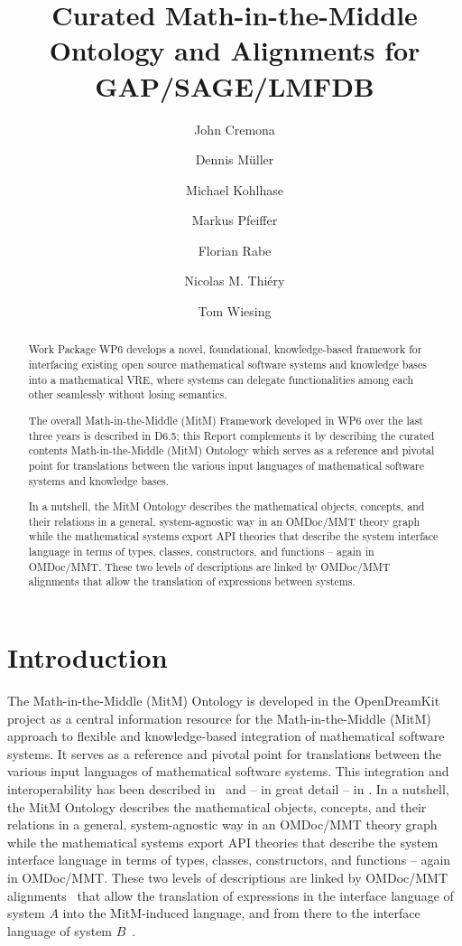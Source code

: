\documentclass{deliverablereport}
\title{Curated Math-in-the-Middle Ontology and Alignments for GAP/SAGE/LMFDB}
\author{John Cremona}
\author{Dennis M\"uller}
\author{Michael Kohlhase}
\author{Markus Pfeiffer}
\author{Florian Rabe}
\author{Nicolas M. Thiéry}
\author{Tom Wiesing}
\begin{document}
\maketitle
\begin{abstract}
  Work Package WP6 develops a novel, foundational, knowledge-based framework for
  interfacing existing open source mathematical software systems and knowledge bases into
  a mathematical VRE, where systems can delegate functionalities among each other
  seamlessly without losing semantics.

  The overall Math-in-the-Middle (MitM) Framework developed in WP6 over the last three
  years is described in D6.5; this Report complements it by describing the curated
  contents Math-in-the-Middle (MitM) Ontology which serves as a reference and pivotal
  point for translations between the various input languages of mathematical software
  systems and knowledge bases.

  In a nutshell, the MitM Ontology describes the mathematical objects, concepts, and their
  relations in a general, system-agnostic way in an OMDoc/MMT theory graph while the
  mathematical systems export API theories that describe the system interface language in
  terms of types, classes, constructors, and functions -- again in OMDoc/MMT. These two
  levels of descriptions are linked by OMDoc/MMT alignments that allow the translation of
  expressions between systems.
\end{abstract}
\tableofcontents\newpage

\section{Introduction}
The Math-in-the-Middle (MitM) Ontology is developed in the OpenDreamKit project as a
central information resource for the Math-in-the-Middle (MitM) approach to flexible and
knowledge-based integration of mathematical software systems. It serves as a reference and
pivotal point for translations between the various input languages of mathematical
software systems. This integration and interoperability has been described
in~\cite{DehKohKon:iop16,WieKohRab:vtuimkb17,KohMuePfe:kbimss17} and -- in great detail --
in \cite{ODK-D6.5}. In a nutshell, the MitM Ontology describes the mathematical objects,
concepts, and their relations in a general, system-agnostic way in an OMDoc/MMT theory
graph while the mathematical systems export API theories that describe the system
interface language in terms of types, classes, constructors, and functions -- again in
OMDoc/MMT. These two levels of descriptions are linked by OMDoc/MMT
alignments~\cite{MueGauKal:cacfms17} that allow the translation of expressions in the
interface language of system $A$ into the MitM-induced language, and from there to the
interface language of system $B$~\cite{MueRoYuRa:abtafs17}.
\end{document}
